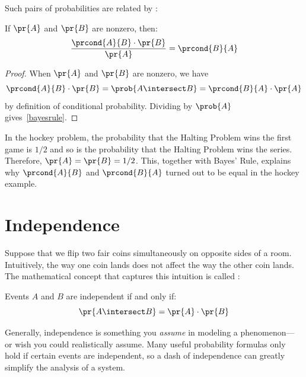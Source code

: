 Such pairs of probabilities are related by :
%
\begin{theorem}
If $\pr{A}$ and $\pr{B}$ are nonzero, then:
%
\begin{equation}\label{bayesrule}
\frac{\prcond{A}{B} \cdot \pr{B}}{\pr{A}} = \prcond{B}{A}
\end{equation}
\end{theorem}

\begin{proof}
When $\pr{A}$ and $\pr{B}$ are nonzero, we have
\[
\prcond{A}{B} \cdot \pr{B} = \prob{A \intersect B} = \prcond{B}{A} \cdot \pr{A}
\]
by definition of conditional probability.  Dividing by $\prob{A}$
gives~\eqref{bayesrule}.

\end{proof}

In the hockey problem, the probability that the Halting Problem wins the
first game is $1/2$ and so is the probability that the Halting Problem
wins the series.  Therefore, $\pr{A} = \pr{B} = 1/2$.  This, together with
Bayes' Rule, explains why $\prcond{A}{B}$ and $\prcond{B}{A}$ turned out to
be equal in the hockey example.


\begin{problems}
\classproblems
{}

\homeworkproblems
{}
\end{problems}

\section{Independence}

Suppose that we flip two fair coins simultaneously on opposite sides
of a room.  Intuitively, the way one coin lands does not affect the
way the other coin lands.  The mathematical concept that captures
this intuition is called :
\begin{definition*}
Events $A$ and $B$ are independent if and only if:
\[
\pr{A \intersect B} = \pr{A} \cdot \pr{B}
\]
\end{definition*}
Generally, independence is something you \textit{assume} in modeling a
phenomenon--- or wish you could realistically assume.  Many useful
probability formulas only hold if certain events are independent, so a
dash of independence can greatly simplify the analysis of a system.

